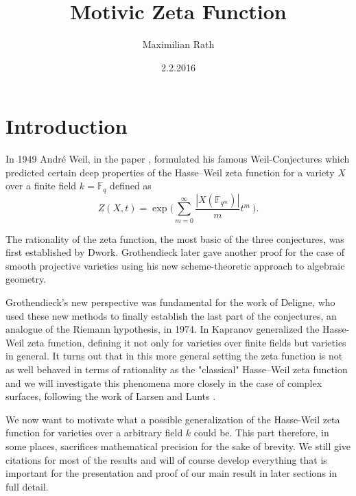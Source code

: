 \documentclass[11pt, a4paper, german]{article}
\author{Maximilian Rath}
\date{2.2.2016}
\title{Motivic Zeta Function}
\theoremstyle{plain}
\newtheorem{theorem}{Theorem}
\theoremstyle{definition}
\begin{document}
\maketitle
\section{Introduction}

In 1949 Andr\'e Weil, in the paper \cite{weil1949}, formulated his famous Weil-Conjectures
which predicted certain deep properties of the Hasse--Weil zeta function for a variety $X$ over a finite field $k = \mathbb{F}_q$ defined as
\[
    Z(X,t) = \exp \big(\sum_{m=0}^\infty \frac{|X(\mathbb{F}_{q^m})|}{m} t^m \ \big).
\]

The rationality of the zeta function, the most basic of the three conjectures, was first established by Dwork. Grothendieck later gave another
proof for the case of smooth projective varieties using his new scheme-theoretic approach to algebraic geometry. 


Grothendieck's new perspective was fundamental for the work of Deligne, who used these new methods to finally establish the 
last part of the conjectures, an analogue of the Riemann hypothesis, in 1974.
In \cite{kapranov} Kapranov generalized the Hasse-Weil zeta function, defining it not only for varieties over finite fields
but varieties in general. It turns out that in this more general setting the zeta function is not as well behaved in terms of rationality as
the "classical" Hasse--Weil zeta function and we will investigate this phenomena more closely in the case of complex surfaces, following the 
work of Larsen and Lunts \cite{MR1996804}.

We now want to motivate what a possible generalization of the Hasse-Weil zeta function for varieties over a arbitrary field $k$ could be.
This part therefore, in some places, sacrifices mathematical precision for the sake of brevity.  
We still give citations for most of the results and will of course develop everything that is important for the presentation and proof 
of our main result in later sections in full detail.
\end{document}
